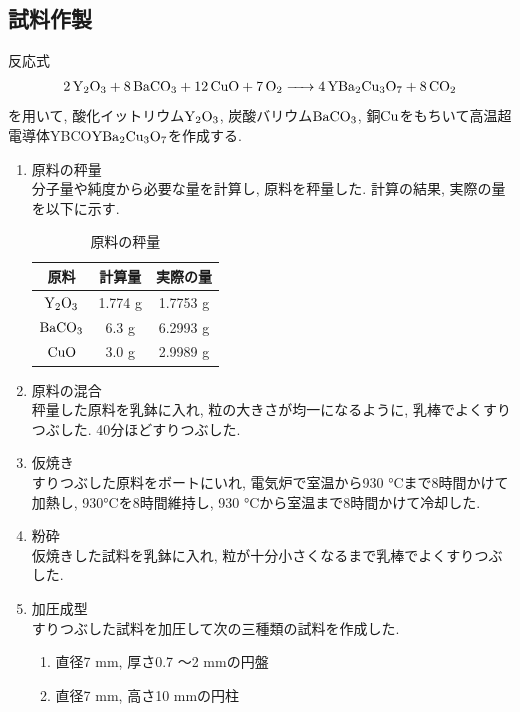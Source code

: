 \documentclass[11pt]{ltjsarticle}
\begin{document}
    \subsection*{試料作製}
      反応式
      \begin{align*}
        \ce{2Y2O3 + 8BaCO3 +12CuO +7O2 -> 4YBa2Cu3O7 + 8CO2}
      \end{align*}
      を用いて, 酸化イットリウム$\ce{Y2O3}$, 炭酸バリウム$\ce{BaCO3}$, 銅$\ce{Cu}$をもちいて高温超電導体YBCO$\ce{YBa2Cu3O7}$を作成する.
      \begin{enumerate}
        \item 原料の秤量\\
              分子量や純度から必要な量を計算し, 原料を秤量した. 
              計算の結果, 実際の量を以下に示す.
              \begin{table}[H]
                \centering
                \begin{tabular}{|c|c|c|}\hline
                  原料 & 計算量 & 実際の量 \\\hline
                  $\ce{Y2O3}$ & 1.774 g & 1.7753 g \\\hline
                  $\ce{BaCO3}$ & 6.3 g & 6.2993 g \\\hline
                  $\ce{CuO}$ & 3.0 g & 2.9989 g \\\hline
                \end{tabular}
                \caption{原料の秤量}
                \label{tab:genryou}
              \end{table}
        \item 原料の混合\\
              秤量した原料を乳鉢に入れ, 粒の大きさが均一になるように, 乳棒でよくすりつぶした. 40分ほどすりつぶした.
        \item 仮焼き\\
              すりつぶした原料をボートにいれ, 電気炉で室温から930 °Cまで8時間かけて加熱し, 930°Cを8時間維持し, 930 °Cから室温まで8時間かけて冷却した.
        \item 粉砕\\
              仮焼きした試料を乳鉢に入れ, 粒が十分小さくなるまで乳棒でよくすりつぶした. 
        \item 加圧成型\\
              すりつぶした試料を加圧して次の三種類の試料を作成した.
              \begin{enumerate}
                \item 直径7 mm, 厚さ0.7 〜2 mmの円盤
                \item 直径7 mm, 高さ10 mmの円柱

\end{enumerate}
\end{enumerate}
\end{document}
